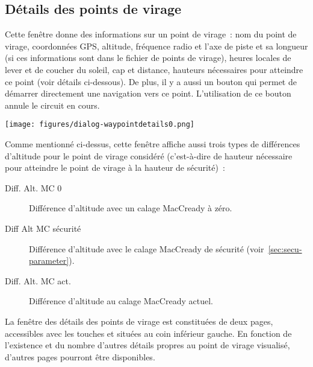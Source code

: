 \subsection*{Détails des points de virage}\label{sec:waypointdetails}
Cette fenêtre donne des informations sur un point de virage~: nom du point de virage,
coordonnées GPS, altitude, fréquence radio et l'axe de piste et sa longueur (si ces informations sont dans le fichier de points de virage),
heures locales de lever et de coucher du soleil, cap et distance, hauteurs nécessaires
pour atteindre ce point (voir détails ci-dessous). De plus, il y a aussi un bouton
 qui permet de démarrer directement
une navigation vers ce point. L'utilisation de ce bouton annule le circuit en cours.
\begin{center}
\texttt{[image: figures/dialog-waypointdetails0.png]}
\end{center}

Comme mentionné ci-dessus, cette fenêtre affiche aussi trois types de différences d'altitude pour le point de virage considéré
(c'est-à-dire de hauteur nécessaire pour atteindre le point de virage à la hauteur de sécurité)~:
\begin{description}
\item[Diff. Alt. MC 0] Différence d'altitude avec un calage MacCready à zéro.
\item[Diff Alt MC sécurité] Différence d'altitude avec le calage MacCready de 
sécurité (voir~\ref{sec:secu-parameter}).
\item[Diff. Alt. MC act.] Différence d'altitude au calage MacCready actuel.
\end{description}

La fenêtre des détails des points de virage est constituées de deux pages, accessibles avec les touches
\bmenuw{$>$} et \bmenuw{$<$} situées au coin inférieur gauche.
En fonction de l'existence et du nombre d'autres détails propres au point de virage visualisé,
d'autres pages pourront être disponibles.


